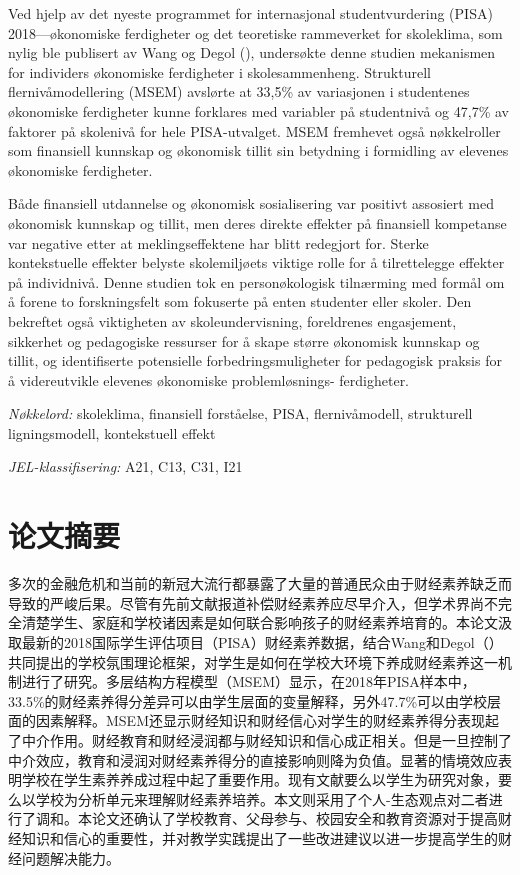 \documentclass[a4paper,11pt,UKenglish,twoside,openright]{report}\usepackage[]{graphicx}\usepackage[]{color}
\begin{document}
\bigskip

\noindent Ved hjelp av det nyeste programmet for internasjonal studentvurdering (PISA) 2018---økonomiske ferdigheter og det teoretiske rammeverket for skoleklima, som nylig ble publisert av Wang og Degol (\citeyear{wang:2016}), undersøkte denne studien mekanismen for individers økonomiske ferdigheter i skolesammenheng. Strukturell flernivåmodellering (MSEM) avslørte at 33,5\% av variasjonen i studentenes økonomiske ferdigheter kunne forklares med variabler på studentnivå og 47,7\% av faktorer på skolenivå for hele PISA-utvalget. MSEM fremhevet også nøkkelroller som finansiell kunnskap og økonomisk tillit sin betydning i formidling av elevenes økonomiske ferdigheter.

\bigskip

\noindent Både finansiell utdannelse og økonomisk sosialisering var positivt assosiert med økonomisk kunnskap og tillit, men deres direkte effekter på finansiell kompetanse var negative etter at meklingseffektene har blitt redegjort for. Sterke kontekstuelle effekter belyste skolemiljøets viktige rolle for å tilrettelegge effekter på individnivå. Denne studien tok en personøkologisk tilnærming med formål om å forene to forskningsfelt som fokuserte på enten studenter eller skoler. Den bekreftet også viktigheten av skoleundervisning, foreldrenes engasjement, sikkerhet og pedagogiske ressurser for å skape større økonomisk kunnskap og tillit, og identifiserte potensielle forbedringsmuligheter for pedagogisk praksis for å videreutvikle elevenes økonomiske problemløsnings-
ferdigheter.

\bigskip

\noindent \textit{Nøkkelord:} skoleklima, finansiell forståelse, PISA, flernivåmodell, strukturell ligningsmodell, kontekstuell effekt

\noindent \textit{JEL-klassifisering:} A21, C13, C31, I21
\setcounter{page}{9}


\chapter*{论文摘要}
\label{Ab.3}

\noindent 多次的金融危机和当前的新冠大流行都暴露了大量的普通民众由于财经素养缺乏而导致的严峻后果。尽管有先前文献报道补偿财经素养应尽早介入，但学术界尚不完全清楚学生、家庭和学校诸因素是如何联合影响孩子的财经素养培育的。本论文汲取最新的2018国际学生评估项目（PISA）财经素养数据，结合Wang和Degol（\citeyear{wang:2016}）共同提出的学校氛围理论框架，对学生是如何在学校大环境下养成财经素养这一机制进行了研究。多层结构方程模型（MSEM）显示，在2018年PISA样本中，33.5\%的财经素养得分差异可以由学生层面的变量解释，另外47.7\%可以由学校层面的因素解释。MSEM还显示财经知识和财经信心对学生的财经素养得分表现起了中介作用。财经教育和财经浸润都与财经知识和信心成正相关。但是一旦控制了中介效应，教育和浸润对财经素养得分的直接影响则降为负值。显著的情境效应表明学校在学生素养养成过程中起了重要作用。现有文献要么以学生为研究对象，要么以学校为分析单元来理解财经素养培养。本文则采用了个人-生态观点对二者进行了调和。本论文还确认了学校教育、父母参与、校园安全和教育资源对于提高财经知识和信心的重要性，并对教学实践提出了一些改进建议以进一步提高学生的财经问题解决能力。
\end{document}
